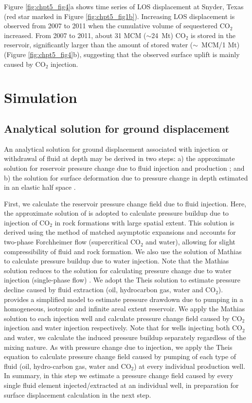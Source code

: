 Figure \ref{fig:chpt5_fig4}a shows time series of LOS displacement at Snyder, Texas (red star marked in Figure \ref{fig:chpt5_fig1b}).  Increasing LOS displacement is observed from 2007 to 2011 when the cumulative volume of sequestered CO$_{2}$ increased.  From 2007 to 2011, about 31 MCM ($\sim$24~Mt) CO$_{2}$ is stored in the reservoir, significantly larger than the amount of stored water ($\sim$~MCM/1 Mt) (Figure \ref{fig:chpt5_fig4}b), suggesting that the observed surface uplift is mainly caused by CO$_{2}$ injection. 

\section{Simulation}
\subsection{Analytical solution for ground displacement}
An analytical solution for ground displacement associated with injection or withdrawal of fluid at depth may be derived in two steps: a) the approximate solution for reservoir pressure change due to fluid injection \cite[]{mathias2009approximate,mathias2009screening} and production \cite[]{theis1935relation}; and b) the solution for surface deformation due to pressure change in depth estimated in an elastic half space \cite[]{xu2012fluid}.

First, we calculate the reservoir pressure change field due to fluid injection.  Here, the approximate solution of \citet{mathias2009approximate} is adopted to calculate pressure buildup due to injection of CO$_{2}$ in rock formations with large spatial extent.  This solution is derived using the method of matched asymptotic expansions and accounts for two-phase Forchheimer flow (supercritical CO$_{2}$ and water), allowing for slight compressibility of fluid and rock formation.  We also use the solution of Mathias to calculate pressure buildup due to water injection.  Note that the Mathias solution reduces to the \citet{theis1935relation} solution for calculating pressure change due to water injection (single-phase flow) \cite[]{mathias2009approximate}.  We adopt the Theis solution to estimate pressure decline caused by fluid extraction (oil, hydrocarbon gas, water and CO$_{2}$).  \citet{theis1935relation} provides a simplified model to estimate pressure drawdown due to pumping in a homogeneous, isotropic and infinite areal extent reservoir.   We apply the Mathias solution to each injection well and calculate pressure change field caused by CO$_{2}$ injection and water injection respectively.  Note that for wells injecting both CO$_{2}$ and water, we calculate the induced pressure buildup separately regardless of the mixing nature.  As with pressure change due to injection, we apply the Theis equation to calculate pressure change field caused by pumping of each type of fluid (oil, hydro-carbon gas, water and CO$_{2}$) at every individual production well.  In summary, in this step we estimate a pressure change field caused by every single fluid element injected/extracted at an individual well, in preparation for surface displacement calculation in the next step. 

